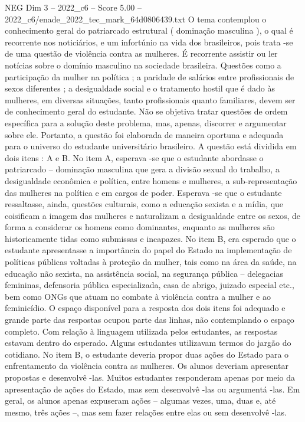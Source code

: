 \begin{textsample}{NEG Dim 3 – 2022\_c6 – Score 5.00 – 2022\_c6/enade\_2022\_tec\_mark\_64d0806439.txt}
O tema contemplou o conhecimento geral do patriarcado estrutural ( dominação masculina ), o qual é recorrente nos noticiários, e um infortúnio na vida dos brasileiros, pois trata -se de uma questão de violência contra as mulheres.
É recorrente assistir ou ler notícias sobre o domínio masculino na sociedade brasileira.
Questões como a participação da mulher na política ; a paridade de salários entre profissionais de sexos diferentes ; a desigualdade social e o tratamento hostil que é dado às mulheres, em diversas situações, tanto profissionais quanto familiares, devem ser de conhecimento geral do estudante.
Não se objetiva tratar questões de ordem específica para a solução deste problema, mas, apenas, discorrer e argumentar sobre ele.
Portanto, a questão foi elaborada de maneira oportuna e adequada para o universo do estudante universitário brasileiro.
A questão está dividida em dois itens : A e B.
No item A, esperava -se que o estudante abordasse o patriarcado – dominação masculina que gera a divisão sexual do trabalho, a desigualdade econômica e política, entre homens e mulheres, a sub-representação das mulheres na política e em cargos de poder.
Esperava -se que o estudante ressaltasse, ainda, questões culturais, como a educação sexista e a mídia, que coisificam a imagem das mulheres e naturalizam a desigualdade entre os sexos, de forma a considerar os homens como dominantes, enquanto as mulheres são historicamente tidas como submissas e incapazes.
No item B, era esperado que o estudante apresentasse a importância do papel do Estado na implementação de políticas públicas voltadas à proteção da mulher, tais como na área da saúde, na educação não sexista, na assistência social, na segurança pública – delegacias femininas, defensoria pública especializada, casa de abrigo, juizado especial etc., bem como ONGs que atuam no combate à violência contra a mulher e ao feminicídio.
O espaço disponível para a resposta dos dois itens foi adequado e grande parte das respostas ocupou parte das linhas, não contemplando o espaço completo.
Com relação à linguagem utilizada pelos estudantes, as respostas estavam dentro do esperado.
Alguns estudantes utilizavam termos do jargão do cotidiano.
No item B, o estudante deveria propor duas ações do Estado para o enfrentamento da violência contra as mulheres.
Os alunos deveriam apresentar propostas e desenvolvê -las.
Muitos estudantes responderam apenas por meio da apresentação de ações do Estado, mas sem desenvolvê -las ou argumentá -las.
Em geral, os alunos apenas expuseram ações – algumas vezes, uma, duas e, até mesmo, três ações –, mas sem fazer relações entre elas ou sem desenvolvê -las.

\end{textsample}
